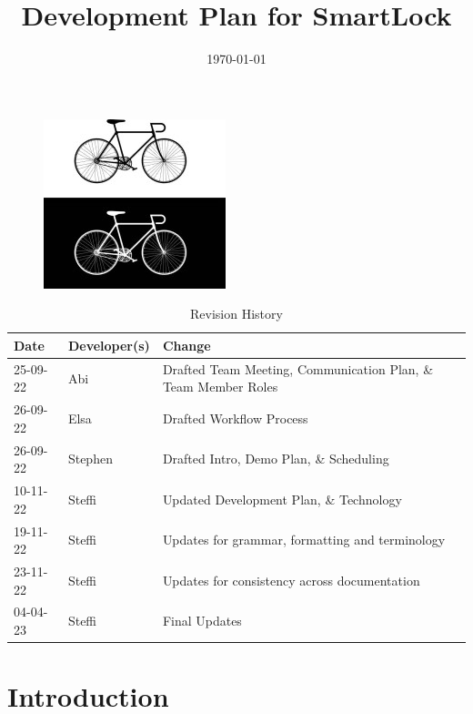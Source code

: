 \documentclass{article}
\title{Development Plan for SmartLock\\\progname}
\author{\authname}
\date{\today}
\begin{document}
\maketitle
\thispagestyle{empty}
\begin{figure}[h!]
  \centering
  \includegraphics[width=0.4\linewidth]{../BikeLogo.jpg}
\end{figure}

\newpage
{}
\begin{table}[hp]
\caption{Revision History} \label{TblRevisionHistory}
\begin{tabularx}{\textwidth}{llX}
\toprule
\textbf{Date} & \textbf{Developer(s)} & \textbf{Change}\\
\midrule
25-09-22 & Abi & Drafted Team Meeting, Communication Plan, \& Team Member Roles\\
26-09-22 & Elsa & Drafted Workflow Process\\
26-09-22 & Stephen & Drafted Intro, Demo Plan, \& Scheduling\\
10-11-22 & Steffi & Updated Development Plan, \& Technology\\
19-11-22 & Steffi & Updates for grammar, formatting and terminology\\
23-11-22 & Steffi & Updates for consistency across documentation\\
04-04-23 & Steffi & Final Updates\\
\bottomrule

\end{tabularx}
\end{table}

\newpage
\tableofcontents
\listoftables

\newpage
{}
\section{Introduction}
\end{document}
